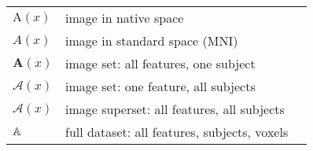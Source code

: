 \begin{singlespacing}
\begin{table}[H]
\begin{tabular}{lll}
  	$\mathrm{A}(x)$       & image in native space                        &                     \\
  	$A(x)$                & image in standard space (MNI)                &                     \\
  	$\bm{A}(x)$           & image set: all features, one subject         &                     \\
  	$\mathcal{A}(x)$      & image set: one feature, all subjects         &                     \\
  	$\bm{\mathcal{A}}(x)$ & image superset: all features, all subjects   &                     \\
  	$\mathbb{A}$             & full dataset: all features, subjects, voxels &                     \\
    \bottomrule
  \end{tabular}
\end{table}
\end{singlespacing}
\clearpage
{}
\setcounter{page}{1}
